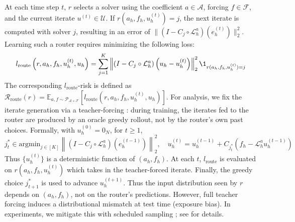 \documentclass{article} %
\begin{document}
At each time step $t$, $r$ selects a solver using the coefficient $a \in \mathcal{A}$, forcing $f \in \mathcal{F}$, and the current iterate $u^{(t)} \in \mathcal{U}$. If $r(a_h, f_h, u^{(t)}_h) = j$, the next iterate is computed with solver $j$, resulting in an error of $\|( I - C_{j} \circ  \mathcal{L}_{h}^a)(e^{(t)}_h)\|^2_2$. Learning such a router requires minimizing the following loss:
\begin{equation} \label{eq:routerloss}
    l_{\text{route}}\left(r, a_h, f_h, u^{(t)}_h, u_h\right) = \sum_{j = 1}^K \left\|\left( I - C_{j} \circ \mathcal{L}_{h}^a\right)\left(u_h - u^{(t)}_h\right)\right\|^2_2\1_{r(a_h, f_h, u^{(t)}_h) = j}
\end{equation}
The corresponding $l_{\text{route}}$-risk is defined as $\mathcal{R}_{\text{route}}\left(r\right) = \mathbb{E}_{a, f \sim \mathcal{P}_{\mathcal{A} \times \mathcal{F}}}[l_{\text{route}}(r, a_h, f_h, u^{(t)}_h, u_h)]$.  
For analysis, we fix the iterate generation via a teacher-forcing \citep{williams1989learning,lamb2016professor}: during training, 
the iterates fed to the router are produced by an oracle greedy rollout, not by the router's own past choices. 
 Formally, with $u_h^{(0)} = 0_N$, for $t \geq 1$, 
$$j^*_t \in \text{argmin}_{j \in [K]} \left\|\left( I - C_{j} \circ \mathcal{L}_{h}^a\right)\left(e^{(t - 1)}_h\right)\right\|^2_2, \quad u^{(t)}_h = u^{(t - 1)}_h + C_{j^{*}_t}\left(f_h - \mathcal{L}_h^a u_h^{(t - 1)}\right)$$
Thus $\{u^{(t)}_h\}$ is a deterministic function of $(a_h, f_h)$. At each $t$, $l_{\text{route}}$ is evaluated on $r(a_h, f_h, u^{(t)}_h)$ which takes in the teacher-forced iterate.
Finally, the greedy choice $j^*_{t + 1}$ is used to advance $u^{(t + 1)}_h$. Thus the input distribution seen by $r$ depends on $(a_h, f_h)$, not on the router's predictions.
However, full teacher forcing induces a distributional mismatch at test time (exposure bias). In experiments, we mitigate this with scheduled sampling \citep{bengio2015scheduled}; see  for details.
\end{document}
